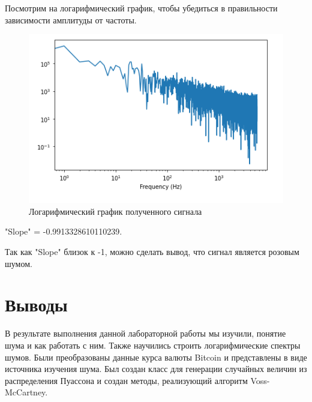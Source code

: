 \documentclass[a4paper, 14pt]{extarticle}
\begin{document}
    Посмотрим на логарифмический график, чтобы убедиться в правильности зависимости амплитуды от частоты.

    \begin{figure}[H]
        \centering
        \includegraphics[width=0.8\linewidth]{voss_spectrum_log}
        \caption{Логарифмический график полученного сигнала}
        \label{fig:voss_spectrum_log}
    \end{figure}

    "Slope" = -0.9913328610110239.

    Так как "Slope" близок к -1, можно сделать вывод, что сигнал является розовым шумом.

    \newpage

    \section{Выводы}
    \label{sec:conclusions}

    В результате выполнения данной лабораторной работы мы изучили, понятие шума и как работать с ним.
    Также научились строить логарифмические спектры шумов.
    Были преобразованы данные курса валюты Bitcoin и представлены в виде источника изучения шума.
    Был создан класс для генерации случайных величин из распределения Пуассона и создан методы, реализующий алгоритм Voss-McCartney.
\end{document}
